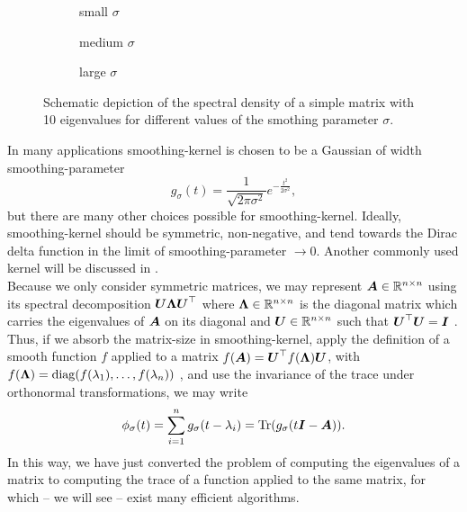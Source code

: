 \begin{figure}[ht]
    \begin{subfigure}[b]{0.33\columnwidth}
        
        \caption{small $\sigma$}
        \label{fig:1-introduction-spectral-density-example-0.01}
    \end{subfigure}
    \begin{subfigure}[b]{0.33\columnwidth}
        
        \caption{medium $\sigma$}
        \label{fig:1-introduction-spectral-density-example-0.02}
    \end{subfigure}
    \begin{subfigure}[b]{0.33\columnwidth}
        
        \caption{large $\sigma$}
        \label{fig:1-introduction-spectral-density-example-0.05}
    \end{subfigure}
    \caption{Schematic depiction of the spectral density of a simple matrix with
    10 eigenvalues for different values of the smothing parameter $\sigma$.}
    \label{fig:1-introduction-smoothened-spectral-density}
\end{figure}

In many applications \gls{smoothing-kernel} is chosen to be a Gaussian of width \gls{smoothing-parameter}
\begin{equation}
    g_{\sigma}(t) = \frac{1}{\sqrt{2 \pi \sigma^2}} e^{-\frac{t^2}{2\sigma^2}},
    \label{equ:1-introduction-def-gaussian-kernel}
\end{equation}
but there are many other choices possible for \gls{smoothing-kernel}. Ideally,
\gls{smoothing-kernel} should be symmetric, non-negative, and tend towards the
Dirac delta function in the limit of \gls{smoothing-parameter} $\to 0$. Another
commonly used kernel will be discussed in .\\

Because we only consider symmetric matrices, 
we may represent $\boldsymbol{A} \in \mathbb{R}^{n \times n}$ using its spectral
decomposition $\boldsymbol{U} \boldsymbol{\Lambda} \boldsymbol{U}^{\top}$ where
$\boldsymbol{\Lambda} \in \mathbb{R}^{n \times n}$ is the diagonal matrix which carries
the eigenvalues of $\boldsymbol{A}$ on its diagonal and $\boldsymbol{U} \in \mathbb{R}^{n \times n}$
such that $\boldsymbol{U}^{\top} \boldsymbol{U} = \boldsymbol{I}$ \cite[Theorem~4.1.5]{horn1985matrix}.
Thus, if we absorb the \gls{matrix-size} in \gls{smoothing-kernel},
apply the definition of a smooth function $f$ applied to a matrix $f(\boldsymbol{A}) = \boldsymbol{U}^{\top} f(\boldsymbol{\Lambda}) \boldsymbol{U}$,
with $f(\boldsymbol{\Lambda}) = \operatorname{diag}(f(\lambda_1), \dots, f(\lambda_n))$ \cite[Definition~1.2]{higham2008functions},
and use the invariance of the trace under orthonormal transformations, we may write
\begin{equation}
    \phi_{\sigma}(t) = \sum_{i=1}^n g_{\sigma}(t - \lambda_i) = \operatorname{Tr}(g_{\sigma}(t\boldsymbol{I} - \boldsymbol{A})).
    \label{equ:1-introduction-spectral-density-as-trace}
\end{equation}
In this way, we have just converted the problem of computing the eigenvalues of
a matrix to computing the trace of a function applied to the same matrix,
for which -- we will see -- exist many efficient algorithms.

